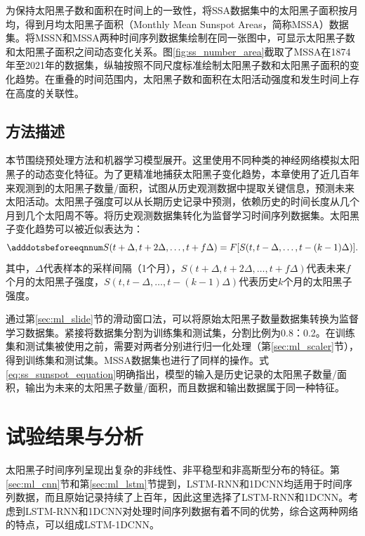 为保持太阳黑子数和面积在时间上的一致性，将SSA数据集中的太阳黑子面积按月均，得到月均太阳黑子面积（Monthly Mean Sunspot Areas，简称MSSA）数据集。将MSSN和MSSA两种时间序列数据集绘制在同一张图中，可显示太阳黑子数和太阳黑子面积之间动态变化关系。图\ref{fig:ss_number_area}截取了MSSA在1874年至2021年的数据集，纵轴按照不同尺度标准绘制太阳黑子数和太阳黑子面积的变化趋势。在重叠的时间范围内，太阳黑子数和面积在太阳活动强度和发生时间上存在高度的关联性。

\subsection{方法描述}\label{subsec:ss_method}

本节围绕预处理方法和机器学习模型展开。这里使用不同种类的神经网络模拟太阳黑子的动态变化特征。为了更精准地捕获太阳黑子变化趋势，本章使用了近几百年来观测到的太阳黑子数量/面积，试图从历史观测数据中提取关键信息，预测未来太阳活动。太阳黑子强度可以从长期历史记录中预测，依赖历史的时间长度从几个月到几个太阳周不等。将历史观测数据集转化为监督学习时间序列数据集。太阳黑子变化趋势可以被近似表达为：
\begin{equation}\adddotsbeforeeqnnum
  \label{eq:ss_sunspot_equation}
  S(t+\Delta,t+2\Delta,\ldots,t+f\Delta)=F[S(t,t-\Delta,\ldots,t-(k-1)\Delta)].
\end{equation}
其中，$\Delta$代表样本的采样间隔（1个月），$S(t+\Delta,t+2\Delta,\ldots,t+f\Delta)$代表未来$f$个月的太阳黑子强度，$S(t,t-\Delta,\ldots,t-(k-1)\Delta)$代表历史$k$个月的太阳黑子强度。

通过第\ref{sec:ml_slide}节的滑动窗口法，可以将原始太阳黑子数量数据集转换为监督学习数据集。紧接将数据集分割为训练集和测试集，分割比例为0.8：0.2。在训练集和测试集被使用之前，需要对两者分别进行归一化处理（第\ref{sec:ml_scaler}节），得到训练集和测试集。MSSA数据集也进行了同样的操作。式\ref{eq:ss_sunspot_equation}明确指出，模型的输入是历史记录的太阳黑子数量/面积，输出为未来的太阳黑子数量/面积，而且数据和输出数据属于同一种特征。

\section{试验结果与分析}\label{sec:ss_result}

太阳黑子时间序列呈现出复杂的非线性、非平稳型和非高斯型分布的特征。第\ref{sec:ml_cnn}节和第\ref{sec:ml_lstm}节提到，LSTM-RNN和1DCNN均适用于时间序列数据，而且原始记录持续了上百年，因此这里选择了LSTM-RNN和1DCNN。考虑到LSTM-RNN和1DCNN对处理时间序列数据有着不同的优势，综合这两种网络的特点，可以组成LSTM-1DCNN。


